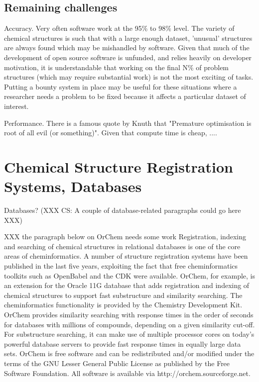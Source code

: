 \documentclass[10pt]{bmc_article}
\newenvironment{bmcformat}{\begin{raggedright}\baselineskip20pt\sloppy\setboolean{publ}{false}}{\end{raggedright}\baselineskip20pt\sloppy}
\begin{document}
\begin{bmcformat}
  \subsection*{Remaining challenges}

Accuracy. Very often software work at the 95\% to 98\% level. The
variety of chemical structures is such that with a large enough
dataset, 'unusual' structures are always found which may be mishandled
by software. Given that much of the development of open source
software is unfunded, and relies heavily on developer motivation, it
is understandable that working on the final N\% of problem structures
(which may require substantial work) is not the most exciting of
tasks. Putting a bounty system in place may be useful for these
situations where a researcher needs a problem to be fixed because it
affects a particular dataset of interest.

Performance. There is a famous quote by Knuth that "Premature
optimisation is root of all evil (or something)". Given that compute
time is cheap, ....

\section*{Chemical Structure Registration Systems, Databases}
Databases? (XXX CS: A couple of database-related paragraphs could go here XXX)

XXX the paragraph below on OrChem needs some work
Registration, indexing and searching of chemical structures in relational databases is one of the core areas of cheminformatics. 
A number of structure registration systems have been published in the last five years, exploiting the fact that 
free cheminformatics toolkits such as OpenBabel and the CDK were available. 
OrChem, for example, is an extension for the Oracle 11G database that adds registration and indexing of chemical structures to support fast substructure and similarity searching. The cheminformatics functionality is provided by the Chemistry Development Kit. OrChem provides similarity searching with response times in the order of seconds for databases with millions of compounds, depending on a given similarity cut-off. For substructure searching, it can make use of multiple processor cores on today's powerful database servers to provide fast response times in equally large data sets.
OrChem is free software and can be redistributed and/or modified under the terms of the GNU Lesser General Public License as published by the Free Software Foundation. All software is available via http://orchem.sourceforge.net.


\end{bmcformat}
\end{document}
